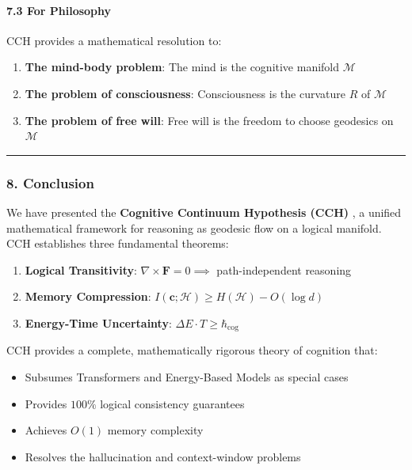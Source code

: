 \documentclass[
  11pt,
  a4paper,
]{article}
\providecommand{\tightlist}{%
  \setlength{\itemsep}{0pt}\setlength{\parskip}{0pt}}
\begin{document}
\paragraph{7.3 For Philosophy}\label{for-philosophy}

CCH provides a mathematical resolution to:

\begin{enumerate}
\def\labelenumi{\arabic{enumi}.}
\tightlist
\item
  \textbf{The mind-body problem}: The mind is the cognitive manifold
  \(\mathcal{M}\)
\item
  \textbf{The problem of consciousness}: Consciousness is the curvature
  \(R\) of \(\mathcal{M}\)
\item
  \textbf{The problem of free will}: Free will is the freedom to choose
  geodesics on \(\mathcal{M}\)
\end{enumerate}

\begin{center}\rule{0.5\linewidth}{0.5pt}\end{center}

\subsubsection{8. Conclusion}\label{conclusion-2}

We have presented the \textbf{Cognitive Continuum Hypothesis (CCH)} , a
unified mathematical framework for reasoning as geodesic flow on a
logical manifold. CCH establishes three fundamental theorems:

\begin{enumerate}
\def\labelenumi{\arabic{enumi}.}
\tightlist
\item
  \textbf{Logical Transitivity}:
  \(\nabla \times \mathbf{F} = 0 \implies\) path-independent reasoning
\item
  \textbf{Memory Compression}:
  \(I(\mathbf{c}; \mathcal{H}) \geq H(\mathcal{H}) - O(\log d)\)
\item
  \textbf{Energy-Time Uncertainty}:
  \(\Delta E \cdot T \geq \hbar_{\text{cog}}\)
\end{enumerate}

CCH provides a complete, mathematically rigorous theory of cognition
that:

\begin{itemize}
\tightlist
\item
  Subsumes Transformers and Energy-Based Models as special cases
\item
  Provides \(100\%\) logical consistency guarantees
\item
  Achieves \(O(1)\) memory complexity
\item
  Resolves the hallucination and context-window problems
\end{itemize}
\end{document}
